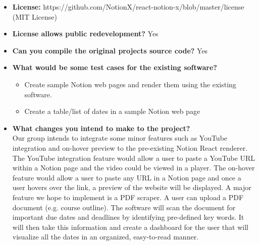\documentclass{article}
\begin{document}
\begin{itemize}
    \item[] \textbf{License:} https://github.com/NotionX/react-notion-x/blob/master/license (MIT License) 

    \item[] \textbf{License allows public redevelopment?} Yes 

    \item[] \textbf{Can you compile the original projects source code?} Yes 

    \item[] \textbf{What would be some test cases for the existing software?}
        \begin{itemize}
            \item Create sample Notion web pages and render them using the existing software.
            \item Create a table/list of dates in a sample Notion web page
        \end{itemize}
    
    \item[] \textbf{What changes you intend to make to the project?}\\
    Our group intends to integrate some minor features such as YouTube integration and on-hover preview to the pre-existing Notion React renderer. The YouTube integration feature would allow a user to paste a YouTube URL within a Notion page and the video could be viewed in a player. The on-hover feature would allow a user to paste any URL in a Notion page and once a user hovers over the link, a preview of the website will be displayed. A major feature we hope to implement is a PDF scraper. A user can upload a PDF document (e.g. course outline). The software will scan the document for important due dates and deadlines by identifying pre-defined key words. It will then take this information and create a dashboard for the user that will visualize all the dates in an organized, easy-to-read manner. 
    
\end{itemize}
\end{document}

